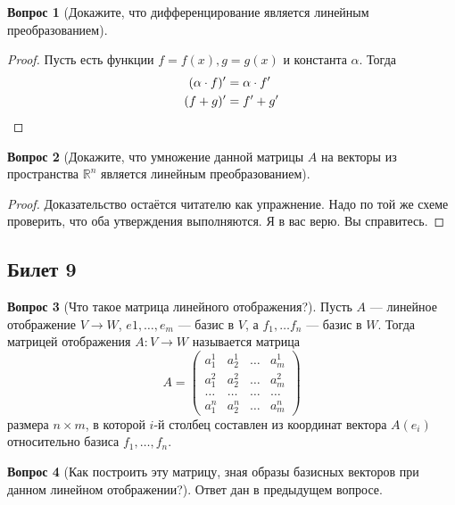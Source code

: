 \documentclass[a4paper,11pt]{article}
\theoremstyle{remark}
\theoremstyle{definition}
\newtheorem{question}{Вопрос}
\numberwithin{question}{subsection}
\begin{document}
\begin{question}[Докажите, что дифференцирование является линейным преобразованием]\(\)
\begin{proof}
Пусть есть функции \(f = f(x), g = g(x)\) и константа \(\alpha\). Тогда
\begin{align*}
	(\alpha \cdot f)' &= \alpha \cdot f' \\
	(f + g)' &= f' + g' \qedhere
\end{align*}
\end{proof}
\end{question}


\begin{question}[Докажите, что умножение данной матрицы \(A\) на векторы из пространства \(\mathbb{R}^n\) является линейным преобразованием]\(\)
\begin{proof}
Доказательство остаётся читателю как упражнение. Надо по той же схеме проверить, что оба утверждения выполняются. Я в вас верю. Вы справитесь. 
\end{proof}
\end{question}


\subsection{Билет 9}
\begin{question}[Что такое матрица линейного отображения?]
Пусть \(A\) --- линейное отображение \(V \rightarrow W\), \(e1, \dots, e_m\) --- базис в \(V\), а \(f_1, \dots f_n\) --- базис в \(W\). Тогда матрицей отображения \(A: V \rightarrow W\) называется матрица
\begin{equation*}
	A = 
	\begin{pmatrix}
		a^1_1 & a^1_2 & \dots & a^1_m \\
		a^2_1 & a^2_2 & \dots & a^2_m \\
		\dots & \dots & \dots & \dots \\
		a^n_1 & a^n_2 & \dots & a^n_m
	\end{pmatrix}
\end{equation*}
размера \(n \times m\), в которой \(i\)-й столбец составлен из координат вектора \(A(e_i)\) относительно базиса \(f_1, \dots, f_n\).
\end{question}

\begin{question}[Как построить эту матрицу, зная образы базисных векторов при данном линейном отображении?]
Ответ дан в предыдущем вопросе.
\end{question}
\end{document}
